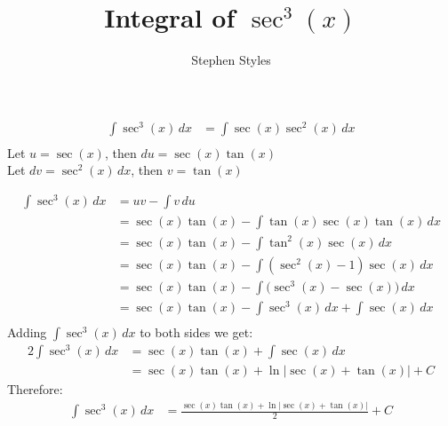 \documentclass[16pt]{article}
\title{Integral of $\sec^3(x)$}
\author{Stephen Styles}
\theoremstyle{remark}
\begin{document}
\maketitle

\begin{align*}
\int \sec^3 (x)\, dx &= \int \sec(x) \sec^2(x) \, dx\\
\end{align*}
Let $u= \sec(x)$, then $du = \sec(x)\tan(x)$\\

Let $dv = \sec^2(x) \, dx$, then $v = \tan(x)$

\begin{align*}
\int \sec^3 (x)\, dx &= uv - \int v\, du\\
&= \sec(x)\tan(x) - \int \tan(x) \sec(x) \tan(x) \, dx\\
&= \sec(x)\tan(x) - \int \tan^2(x) \sec(x) \, dx\\
&= \sec(x)\tan(x) - \int (\sec^2(x)-1) \sec(x) \, dx\\
&= \sec(x)\tan(x) - \int \big(\sec^3(x)-\sec(x)\big) \, dx\\
&= \sec(x)\tan(x) - \int \sec^3(x)\, dx + \int \sec(x) \, dx\\
\end{align*}
Adding $\displaystyle{ \int \sec^3(x) \, dx}$ to both sides we get:
\begin{align*}
2 \int \sec^3 (x)\, dx &= \sec(x)\tan(x)+ \int \sec(x) \, dx\\
&= \sec(x)\tan(x) + \ln|\sec(x)+\tan(x)| + C
\end{align*}
Therefore:
\begin{align*}
\int \sec^3 (x)\, dx &= \frac{\sec(x)\tan(x) + \ln|\sec(x)+\tan(x)|}{2} + C
\end{align*}
\end{document}
